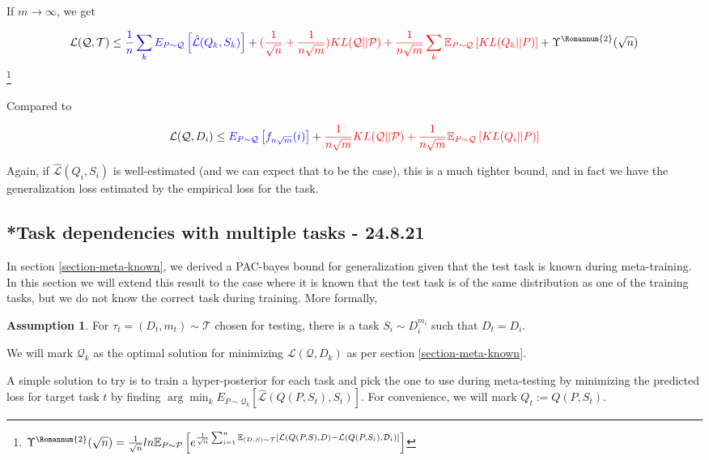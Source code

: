\documentclass[letterpaper]{article}
\theoremstyle{definition}
\newtheorem{assumption}{Assumption}
\begin{document}
If $m\rightarrow\infty$, we get

$$\mathcal{L}(\mathcal{Q}, \mathcal{T}) \leq \textcolor{blue}{\frac{1}{n}\sum_k E_{P\sim \mathcal{Q}} \left [ \hat{\mathcal{L}}(Q_k,S_k) \right ]}+ \textcolor{red}{(\frac{1}{\sqrt{n}}+\frac{1}{n\sqrt{m}})KL(\mathcal{Q}||\mathcal{P})+\frac{1}{n\sqrt{m}}\sum_k \mathbb{E}_{P\sim \mathcal{Q}} \left [KL(Q_k||P) \right ]} + \Upsilon^{\text{\Romannum{2}}}(\sqrt{n})$$
\footnote{$\Upsilon^{\text{\Romannum{2}}}(\sqrt{n})=\frac{1}{\sqrt{n}}ln \mathbb{E}_{P\sim \mathcal{P}} \left [e^{\frac{1}{\sqrt{n}}\sum_{i=1}^{n}\mathbb{E}_{(D,S)\sim \mathcal{T}}\left [\mathcal{L}(Q(P,S),D)- \mathcal{L}(Q(P, S_i), \mathcal{D}_i)\right ]} \right ]$}

Compared to 

$$\mathcal{L}(\mathcal{Q}, D_i)\leq \textcolor{blue}{E_{P\sim \mathcal{Q}}  \left [ f_{n\sqrt{m}}(i)\right ]} + \textcolor{red}{\frac{1}{n\sqrt{m}}KL(\mathcal{Q}||\mathcal{P})+\frac{1}{n\sqrt{m}}\mathbb{E}_{P\sim \mathcal{Q}} \left [KL(Q_i||P)\right ]} $$

Again, if $\hat{\mathcal{L}}(Q_i,S_i)$ is well-estimated (and we can expect that to be the case), this is a much tighter bound, and in fact we have the generalization loss estimated by the empirical loss for the task.


\subsection{*Task dependencies with multiple tasks - 24.8.21} \label{sec:bayes:multi}

In section \ref{section-meta-known}, we derived a PAC-bayes bound for generalization given that the test task is known during meta-training. In this section we will extend this result to the case where it is known that the test task is of the same distribution as one of the training tasks, but we do not know the correct task during training. More formally, 

\begin{assumption} \label{assumption-multitask}
	For $\tau_t=(D_t, m_t)\sim \mathcal{T}$ chosen for testing, there is a task $S_i\sim D_i^{m_i}$ such that $D_t=D_i$.
\end{assumption}

We will mark $\mathcal{Q}_k$ as the optimal solution for minimizing $\mathcal{L}(\mathcal{Q}, D_k)$ as per section \ref{section-meta-known}.

A simple solution to try is to train a hyper-posterior for each task and pick the one to use during meta-testing by minimizing the predicted loss for target task $t$ by finding $\arg\min_{k}E_{P\sim\mathcal{Q}_k}\left [\hat{\mathcal{L}}(Q(P,S_t), S_t)\right ]$.
For convenience, we will mark $Q_t:=Q(P,S_t)$.
\end{document}
